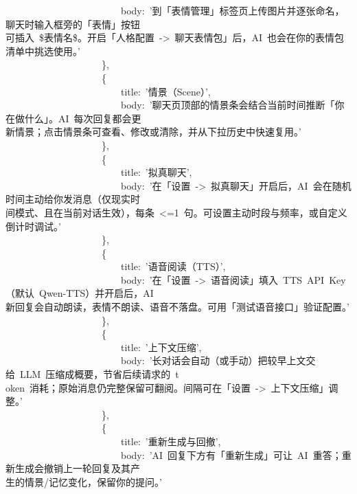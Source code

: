 \documentclass[a4paper,10pt]{article}
\begin{document}
{\ttfamily\footnotesize\raggedright
~~~~~~~~~~~~~~~~~~~~~~~~body:~'到「表情管理」标签页上传图片并逐张命名，聊天时输入框旁的「表情」按钮\\
可插入~\$表情名\$。开启「人格配置~->~聊天表情包」后，AI~也会在你的表情包清单中挑选使用。'\\
~~~~~~~~~~~~~~~~~~~~\},\\
~~~~~~~~~~~~~~~~~~~~\{\\
~~~~~~~~~~~~~~~~~~~~~~~~title:~'情景（Scene）',\\
~~~~~~~~~~~~~~~~~~~~~~~~body:~'聊天页顶部的情景条会结合当前时间推断「你在做什么」。AI~每次回复都会更\\
新情景；点击情景条可查看、修改或清除，并从下拉历史中快速复用。'\\
~~~~~~~~~~~~~~~~~~~~\},\\
~~~~~~~~~~~~~~~~~~~~\{\\
~~~~~~~~~~~~~~~~~~~~~~~~title:~'拟真聊天',\\
~~~~~~~~~~~~~~~~~~~~~~~~body:~'在「设置~->~拟真聊天」开启后，AI~会在随机时间主动给你发消息（仅现实时\\
间模式、且在当前对话生效），每条~<=1~句。可设置主动时段与频率，或自定义倒计时调试。'\\
~~~~~~~~~~~~~~~~~~~~\},\\
~~~~~~~~~~~~~~~~~~~~\{\\
~~~~~~~~~~~~~~~~~~~~~~~~title:~'语音阅读（TTS）',\\
~~~~~~~~~~~~~~~~~~~~~~~~body:~'在「设置~->~语音阅读」填入~TTS~API~Key（默认~Qwen-TTS）并开启后，AI~\\
新回复会自动朗读，表情不朗读、语音不落盘。可用「测试语音接口」验证配置。'\\
~~~~~~~~~~~~~~~~~~~~\},\\
~~~~~~~~~~~~~~~~~~~~\{\\
~~~~~~~~~~~~~~~~~~~~~~~~title:~'上下文压缩',\\
~~~~~~~~~~~~~~~~~~~~~~~~body:~'长对话会自动（或手动）把较早上文交给~LLM~压缩成概要，节省后续请求的~t\\
oken~消耗；原始消息仍完整保留可翻阅。间隔可在「设置~->~上下文压缩」调整。'\\
~~~~~~~~~~~~~~~~~~~~\},\\
~~~~~~~~~~~~~~~~~~~~\{\\
~~~~~~~~~~~~~~~~~~~~~~~~title:~'重新生成与回撤',\\
~~~~~~~~~~~~~~~~~~~~~~~~body:~'AI~回复下方有「重新生成」可让~AI~重答；重新生成会撤销上一轮回复及其产\\
生的情景/记忆变化，保留你的提问。'\\
}
\end{document}
